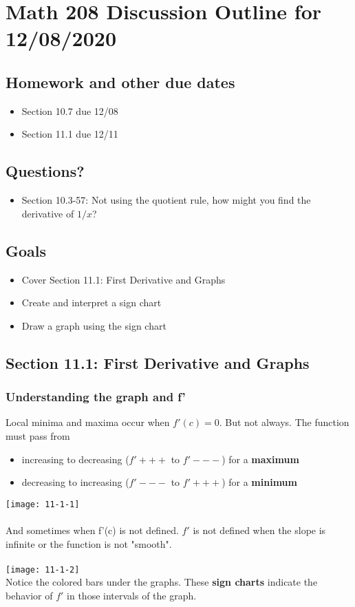 \documentclass[14pt]{extarticle}
\begin{document}
\section*{Math 208 Discussion Outline for 12/08/2020}


\subsection{Homework and other due dates}
\begin{itemize}
\item Section 10.7 due 12/08
\item Section 11.1 due 12/11
\end{itemize}

\subsection{Questions?}
\begin{itemize}
	\item Section 10.3-57: Not using the quotient rule, how might you find the derivative of $1/x$?
\end{itemize}

\subsection{Goals}
\begin{itemize}
	\item Cover Section 11.1: First Derivative and Graphs
	\item Create and interpret a sign chart
	\item Draw a graph using the sign chart
\end{itemize}

\subsection{Section 11.1: First Derivative and Graphs}
\subsubsection*{Understanding the graph and f'}
Local minima and maxima occur when $f'(c) = 0$. But not always. The function must pass from
\begin{itemize}
	\item increasing to decreasing ($f'+++$ to $f'---$) for a \textbf{maximum}
	\item decreasing to increasing ($f'---$ to $f'+++$) for a \textbf{minimum}
\end{itemize}
\texttt{[image: 11-1-1]}
\\
\\
And sometimes when f'(c) is not defined. $f'$ is not defined when the slope is infinite or the function is not "smooth".
\\
\\
\texttt{[image: 11-1-2]}
\\
Notice the colored bars under the graphs. These \textbf{sign charts} indicate the behavior of $f'$ in those intervals of the graph.
\end{document}

